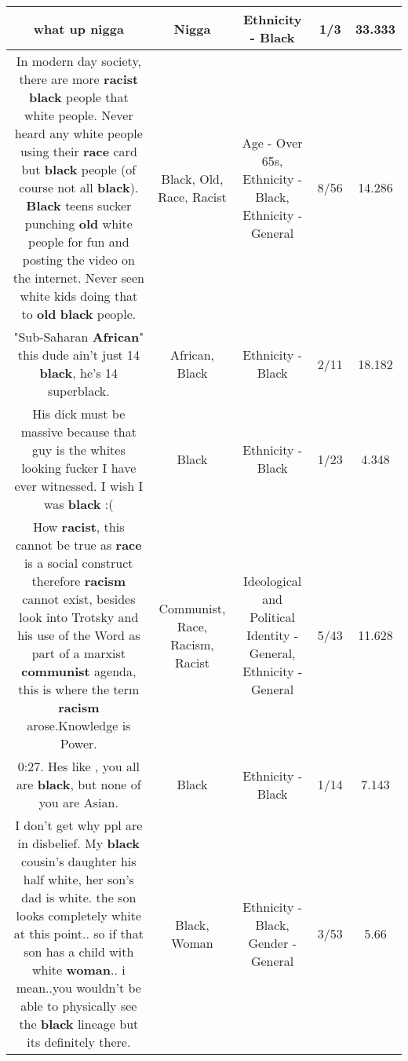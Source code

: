 \documentclass[11pt]{article}
\newlength\mylength
\begin{document}
\begin{center}
\begin{longtable}{|C{.65\mylength}|C{.30\mylength}|C{.12\mylength}|C{.12\mylength}|C{.12\mylength}|}
  \small what up nigga\normalsize   & Nigga & Ethnicity - Black & 1/3 & 33.333 \\  \hline
  \small In modern day society, there are more \textbf{racist} \textbf{black} people that white people. Never heard any white people using their \textbf{race} card but \textbf{black} people (of course not all \textbf{black}). \textbf{Black} teens sucker punching \textbf{old} white people for fun and posting the video on the internet. Never seen white kids doing that to \textbf{old} \textbf{black} people.\normalsize   & Black, Old, Race, Racist & Age - Over 65s, Ethnicity - Black, Ethnicity - General & 8/56 & 14.286 \\  \hline
  \small "Sub-Saharan \textbf{African}" this dude ain't just 14 \textbf{black}, he's 14 superblack.\normalsize   & African, Black & Ethnicity - Black & 2/11 & 18.182 \\  \hline
  \small His dick must be massive because that guy is the whites looking fucker I have ever witnessed. I wish I was \textbf{black} :(\normalsize   & Black & Ethnicity - Black & 1/23 & 4.348 \\  \hline
  \small How \textbf{racist}, this cannot be true as \textbf{race} is a social construct therefore \textbf{racism} cannot exist, besides look into Trotsky and his use of the Word as part of a marxist \textbf{communist} agenda, this is where the term \textbf{racism} arose.Knowledge is Power.\normalsize   & Communist, Race, Racism, Racist &  Ideological and Political Identity - General, Ethnicity - General & 5/43 & 11.628 \\  \hline
  \small 0:27. Hes like , you all are \textbf{black}, but none of you are Asian.\normalsize   & Black & Ethnicity - Black & 1/14 & 7.143 \\  \hline
  \small I don't get why ppl are in disbelief. My \textbf{black} cousin's daughter his half white, her son's dad is white. the son looks completely white at this point.. so if that son has a child with white \textbf{woman}.. i mean..you wouldn't be able to physically see the \textbf{black} lineage but its definitely there.\normalsize   & Black, Woman & Ethnicity - Black, Gender - General & 3/53 & 5.66 \\  \hline

\end{longtable}
\end{center}
\end{document}
